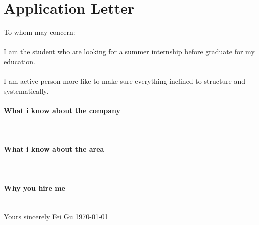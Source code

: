
\section{Application Letter}
To whom may concern:
\newline
\paragraph{}
I am the student who are looking for a summer internship before graduate for my education.
\paragraph{}
I am active person more like to make sure everything inclined to
structure and systematically.
\paragraph{What i know about the company}\\
\paragraph{What i know about the area}\\
\paragraph{Why you hire me}\\

Yours sincerely
Fei Gu
    \today








